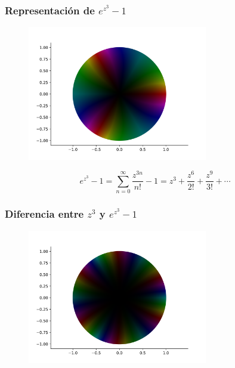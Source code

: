 \documentclass[spanish, a4paper, 12pt, final, slideColor, nototal, colorBG, pdf, noaccumulate, darkblue]{beamer}
\begin{document}
\begin{frame}
    \frametitle{Representación de $e^{z^3}-1$}
    \begin{figure}[!htbp]
        \centering
        \includegraphics[width=0.7\textwidth]{../Aplicacion/e^(z^3)-1.png}
        \label{fig:e^(z^3)-1}
    \end{figure}
    \begin{equation*}
        e^{z^3} - 1 =\sum_{n=0}^{\infty} \frac {z^{3n}}{n!} - 1= z^3 + \frac{z^6}{2!} +\frac{z^9}{3!} + \cdots
    \end{equation*}
\end{frame}


\begin{frame}
    \frametitle{Diferencia entre $z^3$ y $e^{z^3}-1$}
    \begin{figure}[!htbp]
        \centering
        \includegraphics[width=0.7\textwidth]{../Aplicacion/diff6.png}
        \label{fig:diff6}
    \end{figure}
\end{frame}
\end{document}
